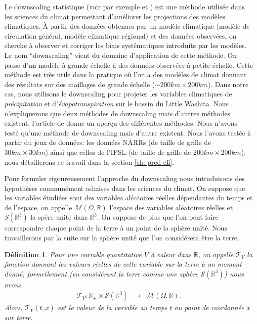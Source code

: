 \documentclass[a4paper,11pt]{article}
\numberwithin{equation}{section}
\newtheorem{definition}{Définition}
\begin{document}
\vspace{0.7cm}

Le downscaling statistique (voir par exemple \cite{vrac2012dynamical} et \cite{ayar2016intercomparison}) est une méthode utilisée dans les sciences du climat permettant d'améliorer les projections des modèles climatiques. À partir des données obtenues par un modèle climatique (modèle de circulation général, modèle climatique régional) et des données observées, on cherche à observer et corriger les biais systématiques introduits par les modèles. Le nom ``downscaling'' vient du domaine d'application de cette méthode. On passe d'un modèle à grande échelle à des données observées à petite échelle. Cette méthode est très utile dans la pratique où l'on a des modèles de climat donnant des résultats sur des maillages de grande échelle ($\sim 200km\times 200km$). Dans notre cas, nous utilisons le downscaling pour projeter les variables climatiques de \textit{précipitation} et d'\textit{évapotranspiration} sur le bassin du Little Washita. Nous n'expliquerons que deux méthodes de downscaling mais d'autres méthodes existent, l'article de \cite{ayar2016intercomparison} donne un aperçu des différentes méthodes.
Nous n'avons testé qu'une méthode de downscaling mais d'autre existent. Nous l'avons testée à partir du jeux de données: les données NARRs (de taille de grille de $30km\times 30 km$) ainsi que celles de l'IPSL (de taille de grille de $200km\times200 km$), nous détaillerons ce travail dans la section \ref{ch: pred-cli}.

\vspace{0.7cm}

Pour formuler rigoureusement l'approche du downscaling nous introduisons des hypothèses communément admises dans les sciences du climat. On suppose que les variables étudiées sont des variables aléatoires réelles dépendantes du temps et de l'espace, on appelle $\mathcal{M}(\Omega,\mathbb{R})$ l'espace des variables aléatoires réelles et $S(\mathbb{R}^3)$ la spère unité dans $\mathbb{R}^3$. On suppose de plus que l'on peut faire correspondre chaque point de la terre à un point de la sphère unité. Nous travaillerons par la suite sur la sphère unité que l'on considérera être la terre.

\begin{definition}
	\label{terre}
	Pour une variable quantitative $V$ à valeur dans $\mathbb{R}$, on appelle $\mathcal{T}_V$ la fonction donnant les  valeurs réelles de cette variable sur la terre à un moment donné, formellement (en considérant la terre comme une sphère $\mathcal{S}(\mathbb{R}^3)$) nous avons
	\begin{equation}
		\begin{array}{ccc}
			\mathcal{T}_V: \mathbb{R}_{+}\times\mathcal{S}(\mathbb{R}^{3}) & \to & \mathcal{M}(\Omega,\mathbb{R}).
		\end{array}
	\end{equation}
	Alors, $\mathcal{T}_V(t,x)$ est la valeur de la variable au temps $t$ au point de coordonnée $x$ sur terre.	
\end{definition}
\end{document}
